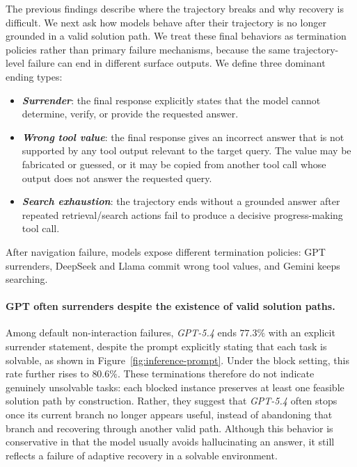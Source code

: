 \documentclass{llmxive}
\begin{document}
The previous findings describe where the trajectory breaks and why recovery is difficult.
We next ask how models behave after their trajectory is no longer grounded in a valid solution path.
We treat these final behaviors as termination policies rather than primary failure mechanisms, because the same trajectory-level failure can end in different surface outputs.
We define three dominant ending types:
\begin{itemize}[topsep=2pt, partopsep=3pt, leftmargin=*, itemsep=-3pt]
\item \textbf{\textit{Surrender}}: the final response explicitly states that the model cannot determine, verify, or provide the requested answer.
\item \textbf{\textit{Wrong tool value}}: the final response gives an incorrect answer that is not supported by any tool output relevant to the target query. The value may be fabricated or guessed, or it may be copied from another tool call whose output does not answer the requested query.
\item \textbf{\textit{Search exhaustion}}: the trajectory ends without a grounded answer after repeated retrieval/search actions fail to produce a decisive progress-making tool call.
\end{itemize}

\begin{takeaway}
After navigation failure, models expose different termination policies: GPT surrenders, DeepSeek and Llama commit wrong tool values, and Gemini keeps searching.
\end{takeaway}

\paragraph{GPT often surrenders despite the existence of valid solution paths.}
Among default non-interaction failures, \textit{GPT-5.4} ends $77.3\%$ with an explicit surrender statement, despite the prompt explicitly stating that each task is solvable, as shown in Figure~\ref{fig:inference-prompt}. Under the block setting, this rate further rises to $80.6\%$. These terminations therefore do not indicate genuinely unsolvable tasks: each blocked instance preserves at least one feasible solution path by construction. Rather, they suggest that \textit{GPT-5.4} often stops once its current branch no longer appears useful, instead of abandoning that branch and recovering through another valid path. Although this behavior is conservative in that the model usually avoids hallucinating an answer, it still reflects a failure of adaptive recovery in a solvable environment.
\end{document}

